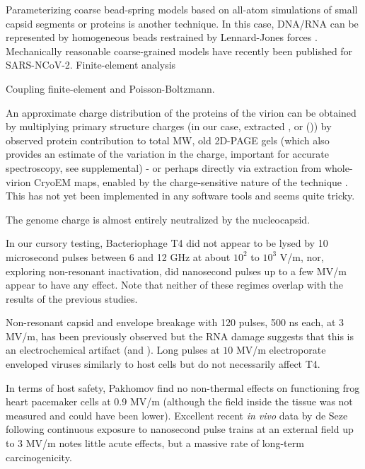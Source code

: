 \documentclass[paper.tex]{subfiles}
\begin{document}
\begin{multicols}{1}
Parameterizing coarse bead-spring models based on all-atom simulations of small capsid segments or proteins \cite{Elucidating2009} is another technique. In this case, DNA/RNA can be represented by homogeneous beads restrained by Lennard-Jones forces \cite{Communication2013}. Mechanically reasonable coarse-grained models have recently been published for SARS-NCoV-2\cite{Multiscale2020}. Finite-element analysis \cite{Finite2008} 

Coupling finite-element and Poisson-Boltzmann\cite{Electrostatic2020a}. 


An approximate charge distribution of the proteins of the virion can be obtained by multiplying primary structure charges (in our case, extracted \cite{CIDER2017}, or (\cite{complete2003})) by observed protein contribution to total MW\cite{Quantitative1981}, old 2D-PAGE gels \cite{Influenza1978}\cite{Structurea} (which also provides an estimate of the variation in the charge, important for accurate spectroscopy, see supplemental) - or perhaps directly via extraction from whole-virion CryoEM maps, enabled by the charge-sensitive nature of the technique \cite{Identification2018}\cite{Electrostatic2020}. This has not yet been implemented in any software tools and seems quite tricky. 

The genome charge is almost entirely neutralized by the nucleocapsid. 

In our cursory testing, Bacteriophage T4 did not appear to be lysed by 10 microsecond pulses between 6 and 12 GHz at about $10^2$ to $10^3$ V/m, nor, exploring non-resonant inactivation, did nanosecond pulses up to a few MV/m appear to have any effect. Note that neither of these regimes overlap with the results of the previous studies.

Non-resonant capsid and envelope breakage with 120 pulses, 500 ns each, at 3 MV/m, has been previously observed\cite{Inactivation1990} but the RNA damage suggests that this is an electrochemical artifact \cite{Formation1996} (and \cite{Microwave1987}). Long pulses at $10$ MV/m electroporate enveloped viruses similarly to host cells\cite{AC2017} but do not necessarily affect T4\cite{Manipulation2013}. 

In terms of host safety, Pakhomov \cite{Comparative} find no non-thermal effects on functioning frog heart pacemaker cells at 0.9 MV/m (although the field inside the tissue was not measured and could have been lower). Excellent recent \textit{in vivo} data by de Seze following continuous exposure to nanosecond pulse trains at an external field up to 3 MV/m \cite{Repeated2020} notes little acute effects, but a massive rate of long-term carcinogenicity. 


\end{multicols}
\end{document}

